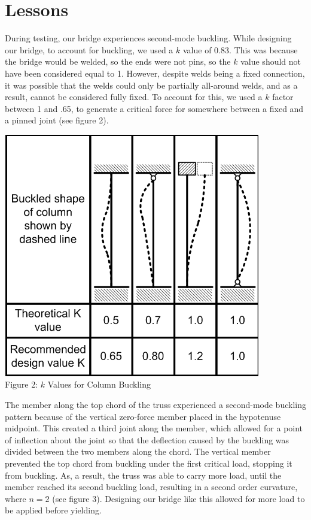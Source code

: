 \documentclass{article}
\begin{document}
    \section{Lessons}
    \indent During testing, our bridge experiences second-mode buckling. While designing our bridge, to account for buckling, we used a \(k\) value of 0.83. This was because the bridge would be welded, so the ends were not pins, so the \(k\) value should not have been considered equal to 1. However, despite welds being a fixed connection, it was possible that the welds could only be partially all-around welds, and as a result, cannot be considered fully fixed. To account for this, we used a \(k\) factor between 1 and .65, to generate a critical force for somewhere between a fixed and a pinned joint (see figure 2). 
    
    \begin{center}
        \includegraphics[scale=1, frame]{buckling.png}
        \\Figure 2: \(k\) Values for Column Buckling
    \end{center}
    
    The member along the top chord of the truss experienced a second-mode buckling pattern because of the vertical zero-force member placed in the hypotenuse midpoint. This created a third joint along the member, which allowed for a point of inflection about the joint so that the deflection caused by the buckling was divided between the two members along the chord. The vertical member prevented the top chord from buckling under the first critical load, stopping it from buckling. As, a result, the truss was able to carry more load, until the member reached its second buckling load, resulting in a second order curvature, where \(n=2\) (see figure 3).  Designing our bridge like this allowed for more load to be applied before yielding. \\
\end{document}
